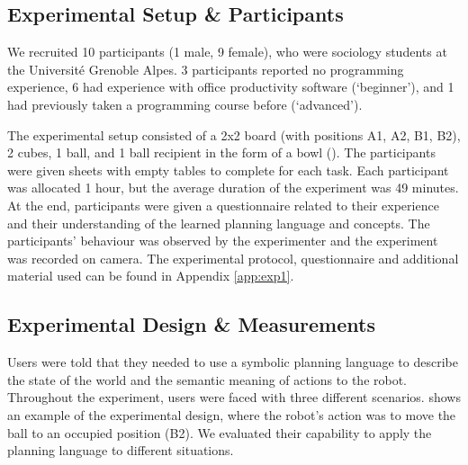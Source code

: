 \subsection{Experimental Setup \& Participants}
We recruited 10 participants (1 male, 9 female), who were sociology students at the Universit\'{e} Grenoble Alpes.
3 participants reported no programming experience, 6  had experience with office productivity software (`beginner'), and 1 had previously taken a programming course before (`advanced').

The experimental setup consisted of a 2x2 board (with positions A1, A2, B1, B2), 2 cubes, 1 ball, and 1 ball recipient in the form of a bowl ().
The participants were given sheets with empty tables to complete for each task.
Each participant was allocated 1 hour, but the average duration of the experiment was 49 minutes.
At the end, participants were given a questionnaire related to their experience and their understanding of the learned planning language and concepts.
The participants' behaviour was observed by the experimenter and the experiment was recorded on camera.
The experimental protocol, questionnaire and additional material used can be found in Appendix \ref{app:exp1}.


 

\subsection{Experimental Design \& Measurements}
Users were told that they needed to use a symbolic planning language to describe the state of the world and the semantic meaning of actions to the robot. 
Throughout the experiment, users were faced with three different scenarios. 
 shows an example of the experimental design, where the robot's action was to move the ball to an occupied position (B2). 
We evaluated their capability to apply the planning language to different situations.

